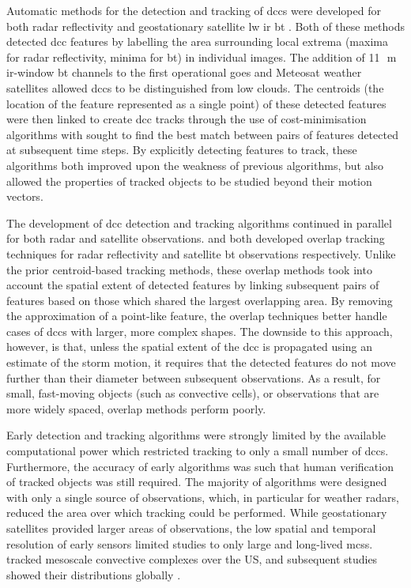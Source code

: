 Automatic methods for the detection and tracking of \acrshort{dcc}s were developed for both radar reflectivity \citep{crane_automatic_1979} and geostationary satellite \acrshort{lw} \acrfull{ir} \acrfull{bt} \citep{endlich_automatic_1981}.
Both of these methods detected \acrshort{dcc} features by labelling the area surrounding local extrema (maxima for radar reflectivity, minima for \acrshort{bt}) in individual images.
The addition of 11\,\unit{\mu m} \acrshort{ir}-window \acrshort{bt} channels to the first operational \acrshort{goes} and Meteosat weather satellites allowed \acrshort{dcc}s to be distinguished from low clouds.
The centroids (the location of the feature represented as a single point) of these detected features were then linked to create \acrshort{dcc} tracks through the use of cost-minimisation algorithms with sought to find the best match between pairs of features detected at subsequent time steps.
By explicitly detecting features to track, these algorithms both improved upon the weakness of previous algorithms, but also allowed the properties of tracked objects to be studied beyond their motion vectors.

The development of \acrshort{dcc} detection and tracking algorithms continued in parallel for both radar and satellite observations.
\citet{rosenfeld_objective_1987} and \citet{williams_satellite-observed_1987} both developed overlap tracking techniques for radar reflectivity and satellite \acrshort{bt} observations respectively.
Unlike the prior centroid-based tracking methods, these overlap methods took into account the spatial extent of detected features by linking subsequent pairs of features based on those which shared the largest overlapping area.
By removing the approximation of a point-like feature, the overlap techniques better handle cases of \acrshort{dcc}s with larger, more complex shapes.
The downside to this approach, however, is that, unless the spatial extent of the \acrshort{dcc} is propagated using an estimate of the storm motion, it requires that the detected features do not move further than their diameter between subsequent observations.
As a result, for small, fast-moving objects (such as convective cells), or observations that are more widely spaced, overlap methods perform poorly.

Early detection and tracking algorithms were strongly limited by the available computational power which restricted tracking to only a small number of \acrshort{dcc}s. 
Furthermore, the accuracy of early algorithms was such that human verification of tracked objects was still required. 
The majority of algorithms were designed with only a single source of observations, which, in particular for weather radars, reduced the area over which tracking could be performed. 
While geostationary satellites provided larger areas of observations, the low spatial and temporal resolution of early sensors limited studies to only large and long-lived \acrshort{mcs}s. 
\citet{maddox_mesoscale_1980a} tracked mesoscale convective complexes over the US, and subsequent studies showed their distributions globally \citep{laing_global_1997}.

